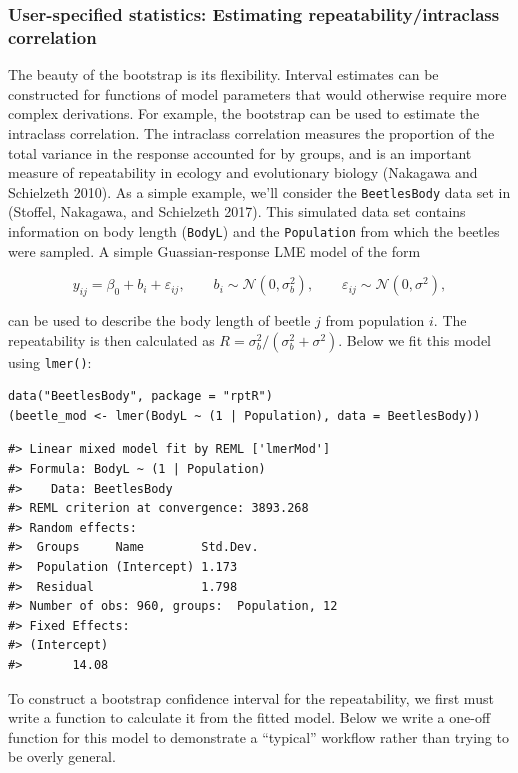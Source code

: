 \hypertarget{user-specified-statistics-estimating-repeatabilityintraclass-correlation}{%
\subsubsection{User-specified statistics: Estimating repeatability/intraclass correlation}\label{user-specified-statistics-estimating-repeatabilityintraclass-correlation}}

The beauty of the bootstrap is its flexibility. Interval estimates can be constructed for functions of model parameters that would otherwise require more complex derivations. For example, the bootstrap can be used to estimate the intraclass correlation. The intraclass correlation measures the proportion of the total variance in the response accounted for by groups, and is an important measure of repeatability in ecology and evolutionary biology (Nakagawa and Schielzeth 2010). As a simple example, we'll consider the \texttt{BeetlesBody} data set in  (Stoffel, Nakagawa, and Schielzeth 2017). This simulated data set contains information on body length (\texttt{BodyL}) and the \texttt{Population} from which the beetles were sampled. A simple Guassian-response LME model of the form

\[
y_{ij} = \beta_0 + b_i + \varepsilon_{ij}, \qquad b_i \sim \mathcal{N}(0, \sigma^2_b), \qquad \varepsilon_{ij} \sim \mathcal{N}(0, \sigma^2),
\]

\noindent can be used to describe the body length of beetle \(j\) from population \(i\). The repeatability is then calculated as \(R = \sigma^2_b / (\sigma^2_b + \sigma^2)\). Below we fit this model using \texttt{lmer()}:

\begin{verbatim}
data("BeetlesBody", package = "rptR")
(beetle_mod <- lmer(BodyL ~ (1 | Population), data = BeetlesBody))
\end{verbatim}

\begin{verbatim}
#> Linear mixed model fit by REML ['lmerMod']
#> Formula: BodyL ~ (1 | Population)
#>    Data: BeetlesBody
#> REML criterion at convergence: 3893.268
#> Random effects:
#>  Groups     Name        Std.Dev.
#>  Population (Intercept) 1.173   
#>  Residual               1.798   
#> Number of obs: 960, groups:  Population, 12
#> Fixed Effects:
#> (Intercept)  
#>       14.08
\end{verbatim}

To construct a bootstrap confidence interval for the repeatability, we first must write a function to calculate it from the fitted model. Below we write a one-off function for this model to demonstrate a ``typical'' workflow rather than trying to be overly general.

